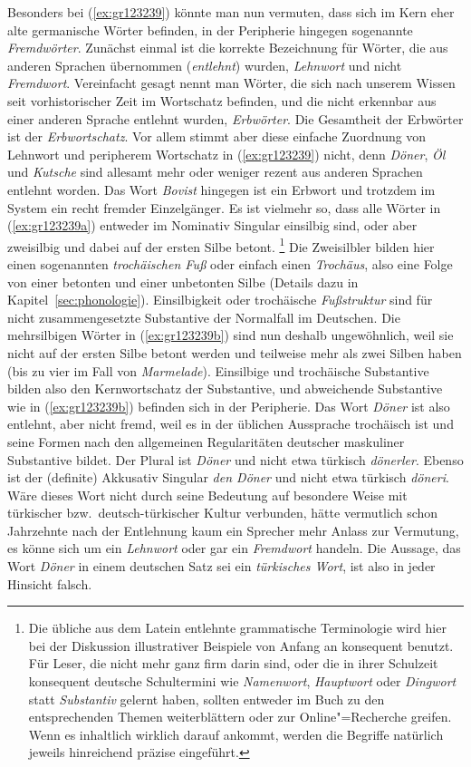 Besonders bei (\ref{ex:gr123239}) könnte man nun vermuten, dass sich im Kern eher alte germanische Wörter befinden, in der Peripherie hingegen sogenannte \textit{Fremdwörter}.
Zunächst einmal ist die korrekte Bezeichnung für Wörter, die aus anderen Sprachen übernommen (\textit{entlehnt}) wurden, \textit{Lehnwort} und nicht \textit{Fremdwort}.
Vereinfacht gesagt nennt man Wörter, die sich nach unserem Wissen seit vorhistorischer Zeit im Wortschatz befinden, und die nicht erkennbar aus einer anderen Sprache entlehnt wurden, \textit{Erbwörter}.
Die Gesamtheit der Erbwörter ist der \textit{Erbwortschatz}.\label{abs:erbwortschatz}
Vor allem stimmt aber diese einfache Zuordnung von Lehnwort und peripherem Wortschatz in (\ref{ex:gr123239}) nicht, denn \textit{Döner}, \textit{Öl} und \textit{Kutsche} sind allesamt mehr oder weniger rezent aus anderen Sprachen entlehnt worden.
Das Wort \textit{Bovist} hingegen ist ein Erbwort und trotzdem im System ein recht fremder Einzelgänger.
Es ist vielmehr so, dass alle Wörter in (\ref{ex:gr123239a}) entweder im Nominativ Singular einsilbig sind, oder aber zweisilbig und dabei auf der ersten Silbe betont.%
\footnote{Die übliche aus dem Latein entlehnte grammatische Terminologie wird hier bei der Diskussion illustrativer Beispiele von Anfang an konsequent benutzt.
Für Leser, die nicht mehr ganz firm darin sind, oder die in ihrer Schulzeit konsequent deutsche Schultermini wie \zB \textit{Namenwort}, \textit{Hauptwort} oder \textit{Dingwort} statt \textit{Substantiv} gelernt haben, sollten entweder im Buch zu den entsprechenden Themen weiterblättern oder zur Online"=Recherche greifen.
Wenn es inhaltlich wirklich darauf ankommt, werden die Begriffe natürlich jeweils hinreichend präzise eingeführt.}
Die Zweisilbler bilden hier einen sogenannten \textit{trochäischen Fuß} oder einfach einen \textit{Trochäus}, also eine Folge von einer betonten und einer unbetonten Silbe (Details dazu in Kapitel~\ref{sec:phonologie}).
Einsilbigkeit oder trochäische \textit{Fußstruktur} sind für nicht zusammengesetzte Substantive der Normalfall im Deutschen.
Die mehrsilbigen Wörter in (\ref{ex:gr123239b}) sind nun deshalb ungewöhnlich, weil sie nicht auf der ersten Silbe betont werden und teilweise mehr als zwei Silben haben (bis zu vier im Fall von \textit{Marmelade}).
Einsilbige und trochäische Substantive bilden also den Kernwortschatz der Substantive, und abweichende Substantive wie in (\ref{ex:gr123239b}) befinden sich in der Peripherie.
Das Wort \textit{Döner} ist also entlehnt, aber nicht fremd, weil es in der üblichen Aussprache trochäisch ist und seine Formen nach den allgemeinen Regularitäten deutscher maskuliner Substantive bildet.
Der Plural ist \textit{Döner} und nicht etwa türkisch \textit{dönerler}.
Ebenso ist der (definite) Akkusativ Singular \textit{den Döner} und nicht etwa türkisch \textit{döneri}.
Wäre dieses Wort nicht durch seine Bedeutung auf besondere Weise mit türkischer bzw.\ deutsch-türkischer Kultur verbunden, hätte vermutlich schon Jahrzehnte nach der Entlehnung kaum ein Sprecher mehr Anlass zur Vermutung, es könne sich um ein \textit{Lehnwort} oder gar ein \textit{Fremdwort} handeln.
Die Aussage, das Wort \textit{Döner} in einem deutschen Satz sei ein \textit{türkisches Wort}, ist also in jeder Hinsicht falsch.

